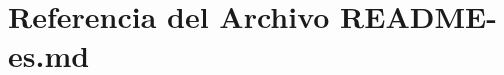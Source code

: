 \hypertarget{_r_e_a_d_m_e-es_8md}{}\section{Referencia del Archivo R\+E\+A\+D\+M\+E-\/es.md}
\label{_r_e_a_d_m_e-es_8md}
